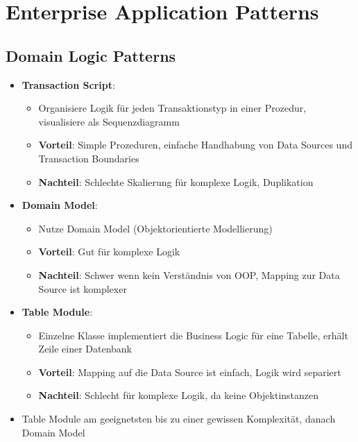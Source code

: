 \section{Enterprise Application Patterns}
\label{eap:sec:enterprise_application_patterns}

\subsection{Domain Logic Patterns}
\label{eap:sub:domain_logic_patterns}


\begin{itemize}
	\item \textbf{Transaction Script}:
	\begin{itemize}
		\item Organisiere Logik für jeden Transaktionstyp in einer Prozedur, visualisiere als Sequenzdiagramm
		\item \textbf{Vorteil}: Simple Prozeduren, einfache Handhabung von Data Sources und Transaction Boundaries
		\item \textbf{Nachteil}: Schlechte Skalierung für komplexe Logik, Duplikation
	\end{itemize}
	\item \textbf{Domain Model}:
	\begin{itemize}
		\item Nutze Domain Model (Objektorientierte Modellierung)
		\item \textbf{Vorteil}: Gut für komplexe Logik
		\item \textbf{Nachteil}: Schwer wenn kein Verständnis von OOP, Mapping zur Data Source ist komplexer
	\end{itemize}
	\item \textbf{Table Module}:
	\begin{itemize}
		\item Einzelne Klasse implementiert die Business Logic für eine Tabelle, erhält Zeile einer Datenbank
		\item \textbf{Vorteil}: Mapping auf die Data Source ist einfach, Logik wird separiert
		\item \textbf{Nachteil}: Schlecht für komplexe Logik, da keine Objektinstanzen
	\end{itemize}
	\item Table Module am geeignetsten bis zu einer gewissen Komplexität, danach Domain Model
\end{itemize}


